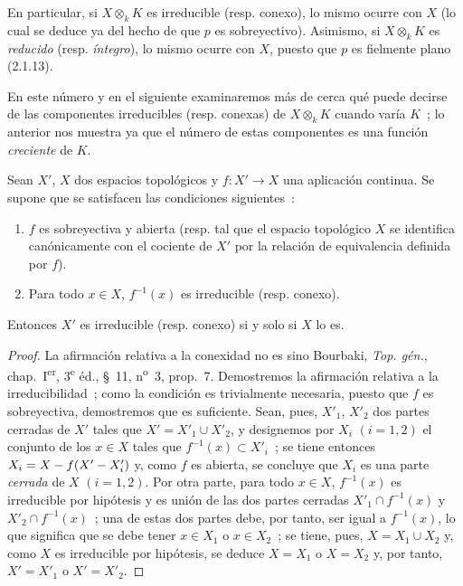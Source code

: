 \begin{env}[4.4.1]
En particular, si $X\otimes_k K$ es irreducible (resp. conexo), lo mismo ocurre
con $X$ (lo cual se deduce ya del hecho de que $p$ es sobreyectivo). Asimismo,
si $X\otimes_k K$ es \emph{reducido} (resp. \emph{íntegro}), lo mismo ocurre con
$X$, puesto que $p$ es fielmente plano (2.1.13).

En este número y en el siguiente examinaremos más de cerca qué puede decirse de
las componentes irreducibles (resp. conexas) de $X\otimes_k K$ cuando varía
$K$~; lo anterior nos muestra ya que el número de estas componentes es una función
\emph{creciente} de $K$.
\end{env}

\begin{lemma}[4.4.2]
Sean $X'$, $X$ dos espacios topológicos y $f:X'\to X$ una aplicación continua.
Se supone que se satisfacen las condiciones siguientes~:
\begin{enumerate}
\item[\textup{(i)}] $f$ es sobreyectiva y abierta \textup{(resp.} tal que el espacio topológico
$X$ se identifica canónicamente con el cociente de $X'$ por la relación de
equivalencia definida por $f$\textup{)}.


\item[\textup{(ii)}] Para todo $x\in X$, $f^{-1}(x)$ es irreducible \textup{(resp.} conexo\textup{)}.
\end{enumerate}
Entonces $X'$ es irreducible \textup{(resp.} conexo\textup{)} si y solo si $X$ lo es.
\end{lemma}

\begin{proof}
La afirmación relativa a la conexidad no es sino Bourbaki,
\emph{Top. gén.}, chap.~I\textsuperscript{er}, 3\textsuperscript{e} éd.,
\S~11, n\textsuperscript{o}~3, prop.~7. Demostremos la afirmación relativa a
la irreducibilidad~; como la condición es trivialmente necesaria, puesto que
$f$ es sobreyectiva, demostremos que es suficiente. Sean, pues, $X'_1$, $X'_2$
dos partes cerradas de $X'$ tales que $X'=X'_1\cup X'_2$, y designemos por
$X_i$ $(i=1,2)$ el conjunto de los $x\in X$ tales que
$f^{-1}(x)\subset X'_i$~; se tiene entonces $X_i=X- f(X'- X'_i)$ y, como $f$ es
abierta, se concluye que $X_i$ es una parte \emph{cerrada} de $X$ $(i=1,2)$.
Por otra parte, para todo $x\in X$, $f^{-1}(x)$ es irreducible por hipótesis y
es unión de las dos partes cerradas $X'_1\cap f^{-1}(x)$ y
$X'_2\cap f^{-1}(x)$~; una de estas dos partes debe, por tanto, ser igual a
$f^{-1}(x)$, lo que significa que se debe tener $x\in X_1$ o $x\in X_2$~; se
tiene, pues, $X=X_1\cup X_2$ y, como $X$ es irreducible por hipótesis, se deduce
$X=X_1$ o $X=X_2$ y, por tanto, $X'=X'_1$ o $X'=X'_2$.
\end{proof}


